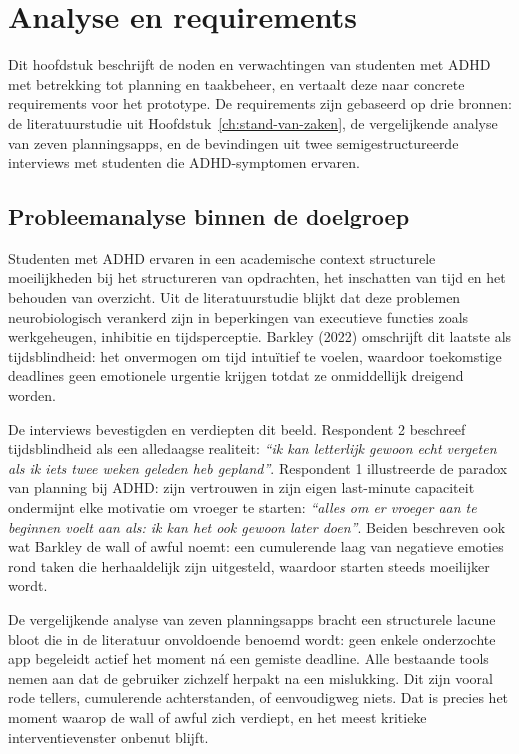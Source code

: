 
\chapter{Analyse en requirements}%
\label{ch:requirementsanalyse}

Dit hoofdstuk beschrijft de noden en verwachtingen van studenten met ADHD
met betrekking tot planning en taakbeheer, en vertaalt deze naar concrete
requirements voor het prototype. De requirements zijn gebaseerd op drie
bronnen: de literatuurstudie uit Hoofdstuk~\ref{ch:stand-van-zaken}, de
vergelijkende analyse van zeven planningsapps, en de bevindingen uit twee
semigestructureerde interviews met studenten die ADHD-symptomen ervaren.

\section{Probleemanalyse binnen de doelgroep}

Studenten met ADHD ervaren in een academische context structurele moeilijkheden
bij het structureren van opdrachten, het inschatten van tijd en het behouden van
overzicht. Uit de literatuurstudie blijkt dat deze problemen neurobiologisch
verankerd zijn in beperkingen van executieve functies zoals werkgeheugen,
inhibitie en tijdsperceptie. Barkley (2022) omschrijft dit laatste als
tijdsblindheid: het onvermogen om tijd intuïtief te voelen, waardoor toekomstige
deadlines geen emotionele urgentie krijgen totdat ze onmiddellijk dreigend worden.

De interviews bevestigden en verdiepten dit beeld. Respondent 2 beschreef
tijdsblindheid als een alledaagse realiteit: \textit{``ik kan letterlijk gewoon
echt vergeten als ik iets twee weken geleden heb gepland''}. Respondent 1
illustreerde de paradox van planning bij ADHD: zijn vertrouwen in zijn eigen
last-minute capaciteit ondermijnt elke motivatie om vroeger te starten:
\textit{``alles om er vroeger aan te beginnen voelt aan als: ik kan het ook
gewoon later doen''}. Beiden beschreven ook wat Barkley de wall of awful noemt:
een cumulerende laag van negatieve emoties rond taken die herhaaldelijk zijn
uitgesteld, waardoor starten steeds moeilijker wordt.

De vergelijkende analyse van zeven planningsapps bracht een structurele
lacune bloot die in de literatuur onvoldoende benoemd wordt: geen enkele
onderzochte app begeleidt actief het moment ná een gemiste deadline. Alle
bestaande tools nemen aan dat de gebruiker zichzelf herpakt na een mislukking.
Dit zijn vooral rode tellers, cumulerende achterstanden, of eenvoudigweg niets. Dat is
precies het moment waarop de wall of awful zich verdiept, en het meest
kritieke interventievenster onbenut blijft.

